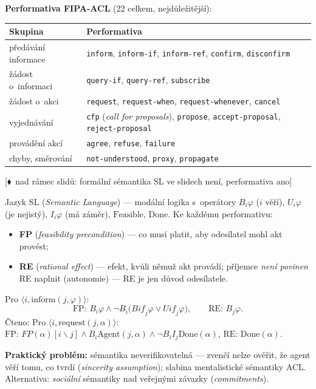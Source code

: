 \documentclass[11pt,a4paper]{article}
\theoremstyle{definition}
\newcommand{\mimoq}[1]{\textcolor{markcol}{\textsf{\footnotesize[$\blacklozenge$~nad rámec slidů: #1]}}}
\begin{document}
\textbf{Performativa FIPA-ACL} (22 celkem, nejdůležitější):
\begin{center}\small
\begin{tabular}{p{} p{}}
\toprule
\textbf{Skupina} & \textbf{Performativa} \\
\midrule
předávání informace & \texttt{inform}, \texttt{inform-if}, \texttt{inform-ref},
  \texttt{confirm}, \texttt{disconfirm} \\
žádost o~informaci & \texttt{query-if}, \texttt{query-ref}, \texttt{subscribe} \\
žádost o~akci & \texttt{request}, \texttt{request-when}, \texttt{request-whenever},
  \texttt{cancel} \\
vyjednávání & \texttt{cfp} (\emph{call for proposals}), \texttt{propose},
  \texttt{accept-proposal}, \texttt{reject-proposal} \\
provádění akcí & \texttt{agree}, \texttt{refuse}, \texttt{failure} \\
chyby, směrování & \texttt{not-understood}, \texttt{proxy}, \texttt{propagate} \\
\bottomrule
\end{tabular}
\end{center}

\noindent\mimoq{formální sémantika SL ve slidech není, performativa ano}

\begin{defbox}
Jazyk SL (\emph{Semantic Language}) --- modální logika s~operátory $B_i\varphi$ ($i$ věří),
$U_i\varphi$ (je nejistý), $I_i\varphi$ (má záměr), $\mathrm{Feasible}$, $\mathrm{Done}$.
Ke každému performativu:
\begin{itemize}
\item \textbf{FP} (\emph{feasibility precondition}) --- co musí platit, aby odesílatel mohl
  akt provést;
\item \textbf{RE} (\emph{rational effect}) --- efekt, kvůli němuž akt provádí; příjemce
  \emph{není povinen} RE naplnit (autonomie) --- RE je jen důvod odesílatele.
\end{itemize}
Pro $\langle i, \mathrm{inform}(j,\varphi)\rangle$:
\[
\text{FP: } B_i\varphi \wedge \neg B_i\big(\mathit{Bif}_j\varphi \vee \mathit{Uif}_j\varphi\big),
\qquad
\text{RE: } B_j\varphi .
\]
Čteno: 
Pro $\langle i, \mathrm{request}(j,\alpha)\rangle$:
$\text{FP: } \mathit{FP}(\alpha)[i \backslash j] \wedge B_i \mathrm{Agent}(j,\alpha)
\wedge \neg B_i I_j \mathrm{Done}(\alpha)$, $\text{RE: } \mathrm{Done}(\alpha)$.

\textbf{Praktický problém:} sémantika neverifikovatelná --- zvenčí nelze ověřit, že agent
věří tomu, co tvrdí (\emph{sincerity assumption}); slabina mentalistické sémantiky ACL.
Alternativa: \emph{sociální} sémantiky nad veřejnými závazky (\emph{commitments}).
\end{defbox}
\end{document}
